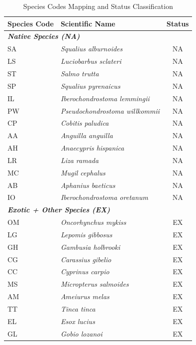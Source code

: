 \documentclass[11pt,a4paper]{article}
\begin{document}
{\begin{table}[h!]
\centering
\caption{Species Codes Mapping and Status Classification}
\label{tab:species_mapping}
\begin{tabular}{llc}
\toprule
\textbf{Species Code} & \textbf{Scientific Name} & \textbf{Status} \\
\midrule
\multicolumn{3}{l}{\textit{\textbf{Native Species (NA)}}} \\
SA & \textit{Squalius alburnoides} & NA \\
LS & \textit{Luciobarbus sclateri} & NA \\
ST & \textit{Salmo trutta} & NA \\
SP & \textit{Squalius pyrenaicus} & NA \\
IL & \textit{Iberochondrostoma lemmingii} & NA \\
PW & \textit{Pseudochondrostoma willkommii} & NA \\
CP & \textit{Cobitis paludica} & NA \\
AA & \textit{Anguilla anguilla} & NA \\
AH & \textit{Anaecypris hispanica} & NA \\
LR & \textit{Liza ramada} & NA \\
MC & \textit{Mugil cephalus} & NA \\
AB & \textit{Aphanius baeticus} & NA \\
IO & \textit{Iberochondrostoma oretanum} & NA \\
\midrule
\multicolumn{3}{l}{\textit{\textbf{Exotic + Other Species (EX)}}} \\
OM & \textit{Oncorhynchus mykiss} & EX \\
LG & \textit{Lepomis gibbosus} & EX \\
GH & \textit{Gambusia holbrooki} & EX \\
CG & \textit{Carassius gibelio} & EX \\
CC & \textit{Cyprinus carpio} & EX \\
MS & \textit{Micropterus salmoides} & EX \\
AM & \textit{Ameiurus melas} & EX \\
TT & \textit{Tinca tinca} & EX \\
EL & \textit{Esox lucius} & EX \\
GL & \textit{Gobio lozanoi} & EX \\
\bottomrule
\end{tabular}
\end{table}


}
\end{document}
